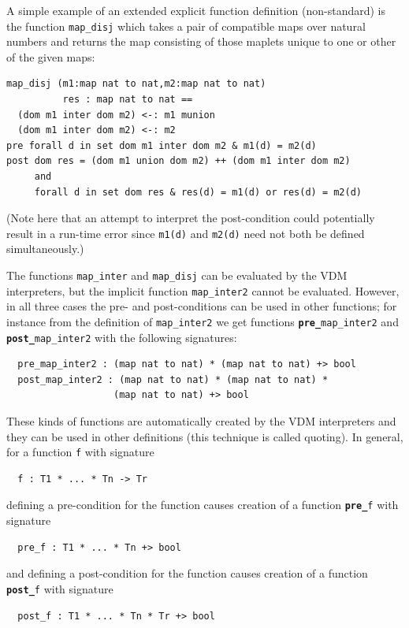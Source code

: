 \documentclass{overturerepchap}
\newcommand{\keyw}[1]{{\bf\ttfamily #1}}
\begin{document}
A simple example of an extended explicit function definition
(non-standard) is the function \texttt{map\_disj} which takes a pair of
compatible maps over natural numbers and returns the map consisting of
those maplets unique to one or other of the given maps:

\begin{lstlisting}
map_disj (m1:map nat to nat,m2:map nat to nat) 
          res : map nat to nat ==
  (dom m1 inter dom m2) <-: m1 munion
  (dom m1 inter dom m2) <-: m2
pre forall d in set dom m1 inter dom m2 & m1(d) = m2(d)
post dom res = (dom m1 union dom m2) ++ (dom m1 inter dom m2) 
     and
     forall d in set dom res & res(d) = m1(d) or res(d) = m2(d)
\end{lstlisting}
\label{mapdisj}

(Note here that an attempt to interpret the post-condition could
potentially result in a run-time error since \texttt{m1(d)} and
\texttt{m2(d)} need not both be defined simultaneously.)

The functions {\tt map\_inter} and {\tt map\_disj} can be evaluated by the
VDM interpreters, but the implicit function {\tt map\_inter2} cannot be evaluated.
However, in all three cases the pre- and post-conditions can be used
in other functions; for instance from the definition of
\texttt{map\_inter2} we get functions \texttt{\keyw{pre\_}map\_inter2}
and \texttt{\keyw{post\_}map\_inter2} with the following signatures:

\begin{lstlisting}
  pre_map_inter2 : (map nat to nat) * (map nat to nat) +> bool
  post_map_inter2 : (map nat to nat) * (map nat to nat) *
                   (map nat to nat) +> bool
\end{lstlisting}
These kinds of functions are automatically created by the VDM
interpreters and they can be used in other definitions (this technique
is called quoting). In general, for a function \texttt{f} with
signature
\begin{lstlisting}
  f : T1 * ... * Tn -> Tr
\end{lstlisting}
defining a pre-condition for the function causes creation of a
function \texttt{\keyw{pre\_}f} with signature
\begin{lstlisting}
  pre_f : T1 * ... * Tn +> bool
\end{lstlisting}
and defining a post-condition for the function causes creation of a
function \texttt{\keyw{post\_}f} with signature
\begin{lstlisting}
  post_f : T1 * ... * Tn * Tr +> bool
\end{lstlisting}
\end{document}

